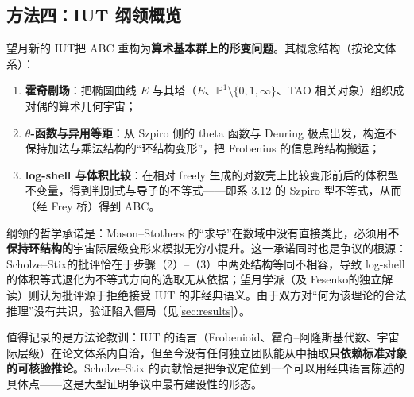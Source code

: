\subsection{方法四：IUT 纲领概览}\label{sec:methods-iut}

望月新的 IUT\cite{mochizuki2012}把 ABC 重构为\textbf{算术基本群上的形变问题}。其概念结构（按论文体系）：

\begin{enumerate}[label=(\arabic*)]
    \item \textbf{霍奇剧场}：把椭圆曲线 $E$ 与其塔（$E$、$\mathbb{P}^1 \setminus \{0,1,\infty\}$、TAO 相关对象）组织成对偶的算术几何宇宙；
    \item \textbf{$\theta$-函数与异用等距}：从 Szpiro 侧的 theta 函数与 Deuring 极点出发，构造不保持加法与乘法结构的“环结构变形”，把 Frobenius 的信息跨结构搬运；
    \item \textbf{log-shell 与体积比较}：在相对 freely 生成的对数壳上比较变形前后的体积型不变量，得到判别式与导子的不等式——即系 3.12 的 Szpiro 型不等式，从而（经 Frey 桥）得到 ABC。
\end{enumerate}

纲领的哲学承诺是：Mason--Stothers 的“求导”在数域中没有直接类比，必须用\textbf{不保持环结构的}宇宙际层级变形来模拟无穷小提升。这一承诺同时也是争议的根源：Scholze--Stix\cite{scholzestix2018}的批评恰在于步骤（2）--（3）中两处结构等同不相容，导致 log-shell 的体积等式退化为不等式方向的选取无从依据；望月学派（及 Fesenko\cite{fesenko2015}的独立解读）则认为批评源于拒绝接受 IUT 的非经典语义。由于双方对“何为该理论的合法推理”没有共识，验证陷入僵局（见\cref{sec:results}）。

\begin{remark}
    值得记录的是方法论教训：IUT 的语言（Frobenioid、霍奇--阿隆斯基代数、宇宙际层级）在论文体系内自洽，但至今没有任何独立团队能从中抽取\textbf{只依赖标准对象的可核验推论}。Scholze--Stix 的贡献恰是把争议定位到一个可以用经典语言陈述的具体点——这是大型证明争议中最有建设性的形态。
\end{remark}
